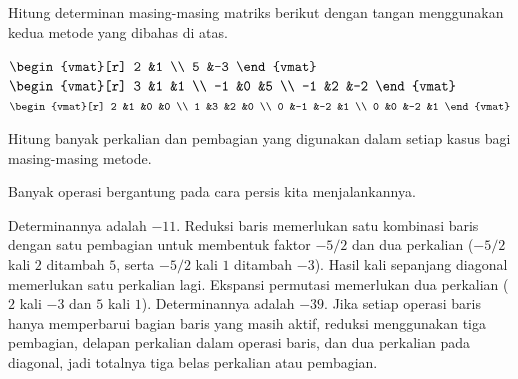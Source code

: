 \begin{exercises}
\begin{answer}
    \end{answer}
  \item 
    Hitung determinan masing-masing matriks berikut dengan tangan menggunakan
    kedua metode yang dibahas di atas.
    \begin{exparts*}
      \partsitem $\begin{vmat}[r]
                    2  &1  \\
                    5  &-3
                  \end{vmat}$
      \partsitem $\begin{vmat}[r]
                    3  &1  &1  \\
                   -1  &0  &5  \\
                   -1  &2  &-2 
                  \end{vmat}$
      \partsitem $\begin{vmat}[r]
                    2  &1  &0  &0  \\
                    1  &3  &2  &0  \\
                    0  &-1 &-2 &1  \\
                    0  &0  &-2 &1
                  \end{vmat}$
    \end{exparts*}
    Hitung banyak perkalian dan pembagian yang digunakan dalam setiap kasus bagi
    masing-masing metode.
     \begin{answer}
       Banyak operasi bergantung pada cara persis kita menjalankannya.
       \begin{exparts}
         \partsitem Determinannya adalah $-11$.
           Reduksi baris memerlukan satu kombinasi baris dengan satu pembagian
           untuk membentuk faktor $-5/2$ dan dua perkalian
           ($-5/2$ kali $2$ ditambah $5$, serta $-5/2$ kali $1$ ditambah $-3$).
           Hasil kali sepanjang diagonal memerlukan satu perkalian lagi.
           Ekspansi permutasi memerlukan dua perkalian ($2$ kali $-3$ dan $5$
           kali $1$).
         \partsitem Determinannya adalah $-39$.
           Jika setiap operasi baris hanya memperbarui bagian baris yang masih
           aktif, reduksi menggunakan tiga pembagian, delapan perkalian dalam
           operasi baris, dan dua perkalian pada diagonal, jadi totalnya tiga
           belas perkalian atau pembagian.

\end{exparts}
\end{answer}
\end{exercises}
